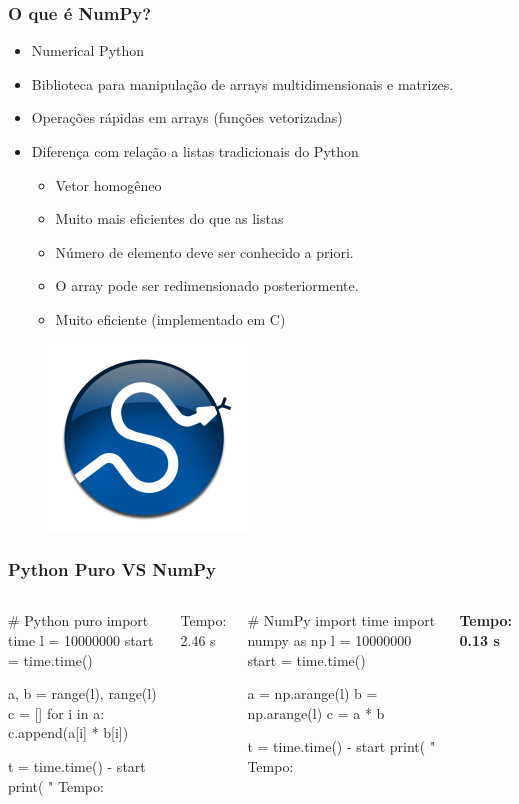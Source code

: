 \documentclass[12pt,t,graphics]{beamer}
\newcommand{\ft}[1]{\frametitle{#1}}
\newcommand{\bi}{\begin{itemize}}
\newcommand{\ei}{\end{itemize}}
\begin{document}

\begin{frame}[fragile]
  \ft{O que é NumPy?}
  \bi
\item Numerical Python
\item Biblioteca para manipulação de arrays
  multidimensionais e matrizes.
\item Operações rápidas em arrays (funções
  vetorizadas)
\item Diferença com relação a listas tradicionais do Python
  \bi
\item Vetor homogêneo
\item Muito mais eficientes do que as listas
\item Número de elemento deve ser conhecido a priori.
\item O array pode ser redimensionado posteriormente.
\item Muito eficiente (implementado em C)
  \ei
  \ei
  \begin{figure}
    \centering
    \includegraphics[scale=0.4]{img/numpy}
    \label{fig:numpy}
  \end{figure}
\end{frame}


\begin{frame}[fragile]
  \ft{Python Puro VS NumPy}
  \begin{columns}
	\begin{python}
# Python puro
import time
l = 10000000
start = time.time()

a, b = range(l), range(l)
c = []
for i in a:
    c.append(a[i] * b[i])

t = time.time() - start
print( " Tempo: %
	\end{python}
	Tempo: 2.46 s
	\begin{python}
# NumPy
import time
import numpy as np
l = 10000000
start = time.time()

a = np.arange(l)
b = np.arange(l)
c = a * b

t = time.time() - start
print( " Tempo: %
	\end{python}
	\textbf{Tempo: 0.13 s}
  \end{columns}
\end{frame}
\end{document}
